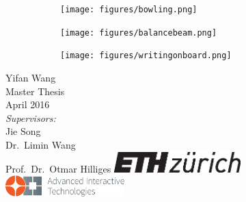 \documentclass[a4paper,twoside,12pt]{scrbook}
\begin{document}
\begin{titlepage}
\begin{figure}[h]
\begin{subfigure}{0.16\linewidth}
\texttt{[image: figures/bowling.png]}
\end{subfigure}%
\begin{subfigure}{0.16\linewidth}
\texttt{[image: figures/balancebeam.png]}
\end{subfigure}%
\begin{subfigure}{0.16\linewidth}
\texttt{[image: figures/writingonboard.png]}
\end{subfigure}
\end{figure}
	\vspace{3cm}
	\sffamily
	\Large
	Yifan Wang
	\\[0.8cm]
	\large
	Master Thesis %
	\\
	April 2016
	\\[1.3cm]
	\emph{Supervisors:}\\
	Jie Song\\
	Dr.\ Limin Wang\\
	Prof.\ Dr.\ Otmar Hilliges		%
	\vfill
	\includegraphics*[height=0.8cm]{figures/eth_logo_kurz_pos.eps} \hfill
	\includegraphics*[height=0.8cm]{figures/logo-ait}
	\vspace{3.4cm}
\end{titlepage}
\clearemptydoublepage

\setcounter{page}{1}





\setcounter{tocdepth}{1}
\tableofcontents

\cleardoublepage
{}
{}
\listoffigures

\cleardoublepage
{}
{}
\listoftables
\cleardoublepage

\renewcommand*{\chapterpagestyle}{mychapterpagestyle}
\renewcommand*{\chapterformat}{} %
\renewcommand*{\sectionformat}{\thesection\enskip\enskip}
\renewcommand*{\subsectionformat}{\thesubsection\enskip}
\renewcommand*{\tableformat}{\tablename~\thetable}
\renewcommand*{\figureformat}{\figurename~\thefigure}
\captionsetup{subrefformat=parens}
\end{document}
